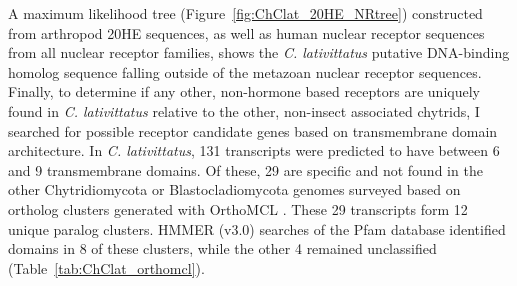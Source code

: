 \indent A maximum likelihood tree (Figure~\ref{fig:ChClat_20HE_NRtree}) constructed from arthropod 20HE sequences, as well as human nuclear receptor sequences from all nuclear receptor families, shows the \textit{C. lativittatus} putative DNA-binding homolog sequence falling outside of the metazoan nuclear receptor sequences. \\
\indent Finally, to determine if any other, non-hormone based receptors are uniquely found in \textit{C. lativittatus} relative to the other, non-insect associated chytrids, I searched for possible receptor candidate genes based on transmembrane domain architecture. In \textit{C. lativittatus}, 131 transcripts were predicted to have between 6 and 9 transmembrane domains. Of these, 29 are specific and not found in the other Chytridiomycota or Blastocladiomycota genomes surveyed based on ortholog clusters generated with OrthoMCL \cite{Li2003}. These 29 transcripts form 12 unique paralog clusters. HMMER (v3.0) searches of the Pfam database identified domains in 8 of these clusters, while the other 4 remained unclassified (Table~\ref{tab:ChClat_orthomcl}).\\


